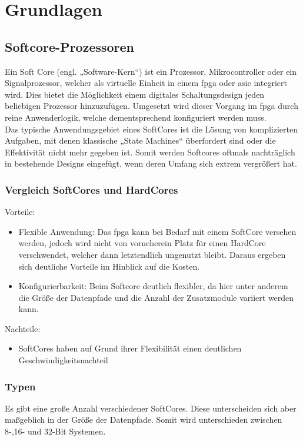 \chapter{Grundlagen}\label{kap:Grundlagen}
\newpage
\section{Softcore-Prozessoren}\label{kap:softcoreprozessoren}

Ein Soft Core (engl. „Software-Kern“) ist ein Prozessor, Mikrocontroller oder ein Signalprozessor, welcher als virtuelle Einheit in einem \ac{fpga} oder \ac{asic} integriert wird.
Dies bietet die Möglichkeit einem digitales Schaltungsdesign jeden beliebigen Prozessor hinzuzufügen. Umgesetzt wird dieser Vorgang im \ac{fpga} durch reine Anwenderlogik,
welche dementsprechend konfiguriert werden muss.\\
Das typische Anwendungsgebiet eines SoftCores ist die Lösung von komplizierten Aufgaben, mit denen klassische „State Machines“ überfordert sind oder die Effektivität
 nicht mehr gegeben ist. Somit werden Softcores oftmals nachträglich in bestehende Designs eingefügt, wenn deren Umfang sich extrem vergrößert hat.\\

\subsection{Vergleich SoftCores und HardCores}\label{kap:vergleich}
Vorteile:
\begin{itemize}
   \item Flexible Anwendung: Das \ac{fpga} kann bei Bedarf mit einem SoftCore versehen werden, jedoch wird nicht von vorneherein Platz für einen HardCore verschwendet, welcher
    dann letztendlich ungenutzt bleibt. Daraus ergeben sich deutliche Vorteile im Hinblick auf die Kosten.
    \item Konfigurierbarkeit: Beim Softcore deutlich flexibler, da hier unter anderem die Größe der Datenpfade und die Anzahl der Zusatzmodule variiert werden kann.
 \end{itemize}


Nachteile:
\begin{itemize}
  \item SoftCores haben auf Grund ihrer Flexibilität einen deutlichen Geschwindigkeitsnachteil
\end{itemize}

\subsection{Typen}\label{kap:typen}
Es gibt eine große Anzahl verschiedener SoftCores. Diese unterscheiden sich aber maßgeblich in der Größe der Datenpfade.
Somit wird unterschieden zwischen 8-,16- und 32-Bit Systemen.\cite{softcore}\\


